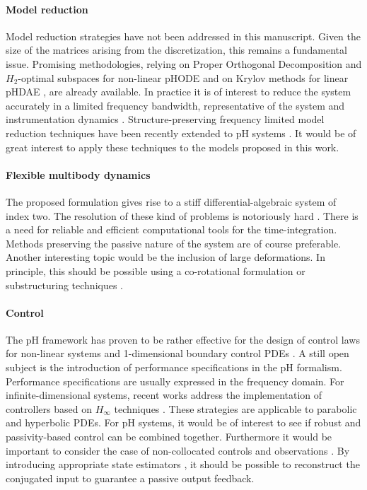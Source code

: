 \paragraph{Model reduction}
Model reduction strategies have not been addressed in this manuscript. Given the size of the matrices arising from the discretization, this remains a fundamental issue. Promising methodologies, relying on Proper Orthogonal Decomposition and $H_2$-optimal subspaces for non-linear pHODE \cite{chaturantabut2016} and on Krylov methods for linear pHDAE \cite{egger2018}, are already available.  In practice it is of interest to reduce the system accurately in a limited frequency bandwidth, representative of the system and instrumentation dynamics \cite{vuillemin2014frequency}. Structure-preserving frequency limited model reduction techniques have been recently extended to pH systems \cite{xu2020sp}. It would be of great interest to apply these techniques to the models proposed in this work.

\paragraph{Flexible multibody dynamics}
The proposed formulation gives rise to a stiff differential-algebraic system of index two. The resolution of these kind of problems is notoriously hard \cite{brenan1995dae}. There is a need for reliable and efficient computational tools for the time-integration. Methods preserving the passive nature of the system are of course preferable. \\ Another interesting topic would be the inclusion of large deformations. In principle, this should be possible using a co-rotational formulation or substructuring techniques \cite{wu1988substructuring}.

\paragraph{Control}
The pH framework has proven to be rather effective for the design of control laws for non-linear systems \cite{ortega2004survey} and 1-dimensional boundary control PDEs \cite{macchelli2020exponential}. A still open subject is the introduction of performance specifications in the pH formalism. Performance specifications are usually expressed in the frequency domain. For infinite-dimensional systems, recent works address the implementation of controllers based on $H_\infty$ techniques \cite{apkarian2018structured,apkarian2020bd}. These strategies are applicable to parabolic and hyperbolic PDEs. For pH systems, it would be of interest to see if robust and passivity-based control can be combined together.  Furthermore it would be important to consider the case of non-collocated controls and observations \cite{cardoso2016}. By introducing appropriate state estimators \cite{yaghmaei2019}, it should be possible to reconstruct the conjugated input to guarantee a passive output feedback.


